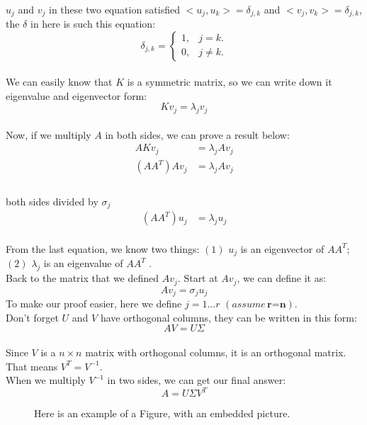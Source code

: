 \documentclass{article}
\newcommand{\an}[1]{{\leavevmode\color{blue}{#1}}}
\begin{document}
\\
$u_j$ and $v_j$ in these two equation satisfied
 $<u_j, u_k> = \delta_{j,k}$ 
 and 
 $<v_j, v_k> = \delta_{j,k}$, \an{Why is this true?}
 the $\delta$ in here is such this equation:
\begin{equation}
		\delta_{j,k}=\left\{
		\begin{array}{ll}
			1, & \mbox{$j=k$}.\\
			0, & \mbox{$j \neq k$}.
		\end{array}
		\right.
\end{equation}
\\
We can easily know that $K$ is a symmetric matrix, so we can write down it eigenvalue and eigenvector form:
\begin{equation}
	Kv_j = \lambda_j v_j
\end{equation}  
\\
Now, if we multiply $A$ in both sides, we can prove a result below:
\begin{align*}
	AKv_j  &= \lambda_j A v_j \\
	(AA^T)Av_j  &= \lambda_j A v_j \\
\end{align*}
\\
both sides divided by $\sigma_j$
\begin{align*}
	(AA^T)u_j  &= \lambda_j  u_j
\end{align*}
\\
From the last equation, we know two things: $(1)$ $u_j$ is an eigenvector of $AA^T$; $(2)$ $\lambda_j$ is an eigenvalue of $AA^T$ .
\\[2in]
Back to the matrix that we defined $Av_j$. \an{I don't understand what this previous sentence is saying: $A$ is given, you didn't define it.} Start at $Av_j$, we can define it as:
\begin{equation}
	Av_j = \sigma_j u _j
\end{equation}
To make our proof easier, here we define $j = 1 ... r$ $(assume \, \textbf{r=n})$.
\\[3in]
Don't forget $U$ and $V$ have orthogonal columns, \an{You never defined $U$.} they can be written in this form:
\begin{equation}
	AV = U \Sigma
\end{equation}
\\
Since $V$ is a $n \times n$ matrix with orthogonal columns, it is an orthogonal  matrix. That means $V^T = V^{-1}$.
\\
When we multiply $V^{-1}$ in two sides, we can get our final answer:
\begin{equation}
	A = U \Sigma V^T 
\end{equation} 



\begin{figure}[htbp]
	\caption{Here is an example of a Figure, with an embedded picture.}
\end{figure}
\end{document}
